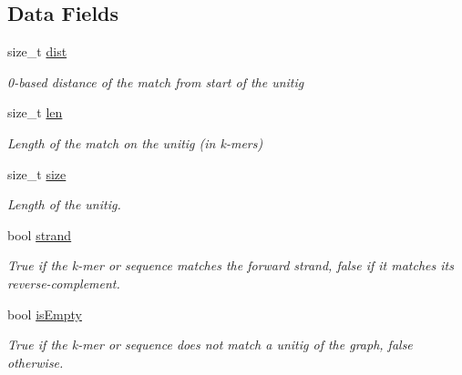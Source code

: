 \subsection*{Data Fields}
\begin{DoxyCompactItemize}
\item 
\mbox{\label{structUnitigMap_a5496174e14b080e15d67f90ad59aed08}} 
size\+\_\+t \hyperlink{structUnitigMap_a5496174e14b080e15d67f90ad59aed08}{dist}
\begin{DoxyCompactList}\small\item\em 0-\/based distance of the match from start of the unitig \end{DoxyCompactList}\item 
\mbox{\label{structUnitigMap_a748e7e2bc835494c2894d8a88d954043}} 
size\+\_\+t \hyperlink{structUnitigMap_a748e7e2bc835494c2894d8a88d954043}{len}
\begin{DoxyCompactList}\small\item\em Length of the match on the unitig (in k-\/mers) \end{DoxyCompactList}\item 
\mbox{\label{structUnitigMap_ae324a32571bed565f8161c9b482d3d4a}} 
size\+\_\+t \hyperlink{structUnitigMap_ae324a32571bed565f8161c9b482d3d4a}{size}
\begin{DoxyCompactList}\small\item\em Length of the unitig. \end{DoxyCompactList}\item 
\mbox{\label{structUnitigMap_a19c25f9971430e1d6640a70d0028016f}} 
bool \hyperlink{structUnitigMap_a19c25f9971430e1d6640a70d0028016f}{strand}
\begin{DoxyCompactList}\small\item\em True if the k-\/mer or sequence matches the forward strand, false if it matches its reverse-\/complement. \end{DoxyCompactList}\item 
\mbox{\label{structUnitigMap_a152c942911cb2ccf57d4c4c1e3f40178}} 
bool \hyperlink{structUnitigMap_a152c942911cb2ccf57d4c4c1e3f40178}{is\+Empty}
\begin{DoxyCompactList}\small\item\em True if the k-\/mer or sequence does not match a unitig of the graph, false otherwise. \end{DoxyCompactList}\item 

\end{DoxyCompactItemize}
